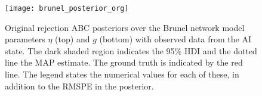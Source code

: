 \begin{figure}[H]
    \centering
    \texttt{[image: brunel\_posterior\_org]}
    \caption{Original rejection ABC posteriors over the Brunel network model parameters $\eta$ (top) and $g$ (bottom) with observed data from the AI state. The dark shaded region indicates the 95\% HDI and the dotted line the MAP estimate. The ground truth is indicated by the red line. The legend states the numerical values for each of these, in addition to the RMSPE in the posterior.
    }
\end{figure}





